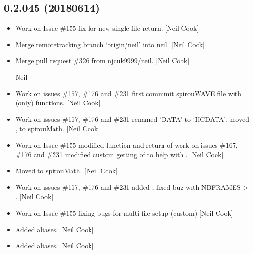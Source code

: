\documentclass[a4paper,10pt,english]{report}
\begin{document}
\subsection{0.2.045 (2018\sphinxhyphen{}06\sphinxhyphen{}14)}
\label{\detokenize{misc/changelog:id439}}\begin{itemize}
\item {} 
Work on Issue \#155 \sphinxhyphen{} fix for new single file return. {[}Neil Cook{]}

\item {} 
Merge remote\sphinxhyphen{}tracking branch ‘origin/neil’ into neil. {[}Neil Cook{]}

\item {} 
Merge pull request \#326 from njcuk9999/neil. {[}Neil Cook{]}

Neil

\item {} 
Work on issues \#167, \#176 and \#231 \sphinxhyphen{} first commmit spirouWAVE file
with  (only) functions. {[}Neil Cook{]}

\item {} 
Work on issues \#167, \#176 and \#231 \sphinxhyphen{} renamed ‘DATA’ to ‘HCDATA’, moved
,  to spirouMath. {[}Neil Cook{]}

\item {} 
Work on Issue \#155 \sphinxhyphen{} modified  function and return of
 work on issues \#167, \#176 and \#231 \sphinxhyphen{} modified custom
getting of  to help with . {[}Neil Cook{]}

\item {} 
Moved  to spirouMath. {[}Neil Cook{]}

\item {} 
Work on issues \#167, \#176 and \#231 \sphinxhyphen{} added , fixed bug with
NBFRAMES  \textendash{}\textgreater{} . {[}Neil Cook{]}

\item {} 
Work on Issue \#155 \sphinxhyphen{} fixing bugs for multi file setup (custom) {[}Neil
Cook{]}

\item {} 
Added aliases. {[}Neil Cook{]}

\item {} 
Added aliases. {[}Neil Cook{]}


\end{itemize}
\end{document}
